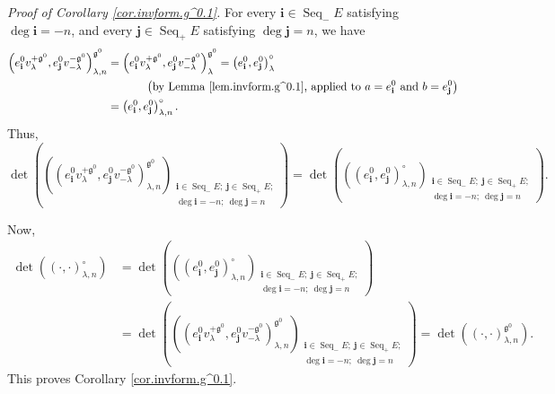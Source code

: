 \documentclass
[numbers=enddot,12pt,final,onecolumn,german,notitlepage]{scrartcl}%
\theoremstyle{definition}
\begin{document}
\textit{Proof of Corollary \ref{cor.invform.g^0.1}.} For every $\mathbf{i}%
\in\operatorname*{Seq}\nolimits_{-}E$ satisfying $\deg\mathbf{i}=-n$, and
every $\mathbf{j}\in\operatorname*{Seq}\nolimits_{+}E$ satisfying
$\deg\mathbf{j}=n$, we have%
\begin{align*}
\left(  e_{\mathbf{i}}^{0}v_{\lambda}^{+\mathfrak{g}^{0}},e_{\mathbf{j}}%
^{0}v_{-\lambda}^{-\mathfrak{g}^{0}}\right)  _{\lambda,n}^{\mathfrak{g}^{0}}
&  =\left(  e_{\mathbf{i}}^{0}v_{\lambda}^{+\mathfrak{g}^{0}},e_{\mathbf{j}%
}^{0}v_{-\lambda}^{-\mathfrak{g}^{0}}\right)  _{\lambda}^{\mathfrak{g}^{0}%
}=\left(  e_{\mathbf{i}}^{0},e_{\mathbf{j}}^{0}\right)  _{\lambda}^{\circ}\\
&  \ \ \ \ \ \ \ \ \ \ \left(  \text{by Lemma \ref{lem.invform.g^0.1}, applied
to }a=e_{\mathbf{i}}^{0}\text{ and }b=e_{\mathbf{j}}^{0}\right) \\
&  =\left(  e_{\mathbf{i}}^{0},e_{\mathbf{j}}^{0}\right)  _{\lambda,n}^{\circ
}.
\end{align*}
Thus,%
\[
\det\left(  \left(  \left(  e_{\mathbf{i}}^{0}v_{\lambda}^{+\mathfrak{g}^{0}%
},e_{\mathbf{j}}^{0}v_{-\lambda}^{-\mathfrak{g}^{0}}\right)  _{\lambda
,n}^{\mathfrak{g}^{0}}\right)  _{\substack{\mathbf{i}\in\operatorname*{Seq}%
\nolimits_{-}E;\ \mathbf{j}\in\operatorname*{Seq}\nolimits_{+}E;\\\deg
\mathbf{i}=-n;\ \deg\mathbf{j}=n}}\right)  =\det\left(  \left(  \left(
e_{\mathbf{i}}^{0},e_{\mathbf{j}}^{0}\right)  _{\lambda,n}^{\circ}\right)
_{\substack{\mathbf{i}\in\operatorname*{Seq}\nolimits_{-}E;\ \mathbf{j}%
\in\operatorname*{Seq}\nolimits_{+}E;\\\deg\mathbf{i}=-n;\ \deg\mathbf{j}%
=n}}\right)  .
\]


Now,%
\begin{align*}
\det\left(  \left(  \cdot,\cdot\right)  _{\lambda,n}^{\circ}\right)   &
=\det\left(  \left(  \left(  e_{\mathbf{i}}^{0},e_{\mathbf{j}}^{0}\right)
_{\lambda,n}^{\circ}\right)  _{\substack{\mathbf{i}\in\operatorname*{Seq}%
\nolimits_{-}E;\ \mathbf{j}\in\operatorname*{Seq}\nolimits_{+}E;\\\deg
\mathbf{i}=-n;\ \deg\mathbf{j}=n}}\right) \\
&  =\det\left(  \left(  \left(  e_{\mathbf{i}}^{0}v_{\lambda}^{+\mathfrak{g}%
^{0}},e_{\mathbf{j}}^{0}v_{-\lambda}^{-\mathfrak{g}^{0}}\right)  _{\lambda
,n}^{\mathfrak{g}^{0}}\right)  _{\substack{\mathbf{i}\in\operatorname*{Seq}%
\nolimits_{-}E;\ \mathbf{j}\in\operatorname*{Seq}\nolimits_{+}E;\\\deg
\mathbf{i}=-n;\ \deg\mathbf{j}=n}}\right)  =\det\left(  \left(  \cdot
,\cdot\right)  _{\lambda,n}^{\mathfrak{g}^{0}}\right)  .
\end{align*}
This proves Corollary \ref{cor.invform.g^0.1}.
\end{document}
